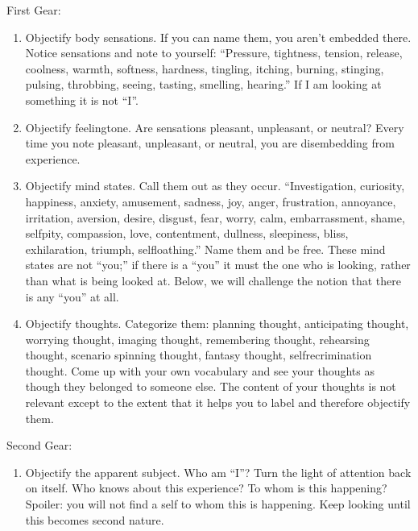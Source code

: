 \documentclass[a5paper,10pt,english]{book}
\begin{document}
\sphinxAtStartPar
First Gear:
\begin{enumerate}
%
\item {} 
\sphinxAtStartPar
Objectify body sensations. If you can name them, you
aren’t embedded there. Notice sensations and note to yourself:
“Pressure, tightness, tension, release, coolness, warmth, softness,
hardness, tingling, itching, burning, stinging, pulsing, throbbing,
seeing, tasting, smelling, hearing.” If I am looking at something it is
not “I”.

\item {} 
\sphinxAtStartPar
Objectify feeling\sphinxhyphen{}tone. Are sensations pleasant, unpleasant,
or neutral? Every time you note pleasant, unpleasant, or neutral, you
are dis\sphinxhyphen{}embedding from experience.

\item {} 
\sphinxAtStartPar
Objectify mind states. Call them
out as they occur. “Investigation, curiosity, happiness, anxiety,
amusement, sadness, joy, anger, frustration, annoyance, irritation,
aversion, desire, disgust, fear, worry, calm, embarrassment, shame,
self\sphinxhyphen{}pity, compassion, love, contentment, dullness, sleepiness, bliss,
exhilaration, triumph, self\sphinxhyphen{}loathing.” Name them and be free. These mind
states are not “you;” if there is a “you” it must the one who is
looking, rather than what is being looked at. Below, we will challenge
the notion that there is any “you” at all.

\item {} 
\sphinxAtStartPar
Objectify thoughts.
Categorize them: planning thought, anticipating thought, worrying
thought, imaging thought, remembering thought, rehearsing thought,
scenario spinning thought, fantasy thought, self\sphinxhyphen{}recrimination thought.
Come up with your own vocabulary and see your thoughts as though they
belonged to someone else. The content of your thoughts is not relevant
except to the extent that it helps you to label and therefore objectify
them.

\end{enumerate}

\sphinxAtStartPar
Second Gear:
\begin{enumerate}
%
\item {} 
\sphinxAtStartPar
Objectify the apparent subject. Who am “I”? Turn the
light of attention back on itself. Who knows about this experience? To
whom is this happening? Spoiler: you will not find a self to whom this
is happening. Keep looking until this becomes second nature.

\end{enumerate}
\end{document}
